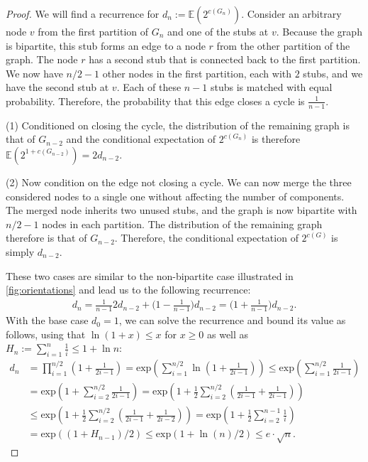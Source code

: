\documentclass[a4paper,USenglish,cleveref]{lipics-v2021}
\begin{document}
\begin{proof}
  We will find a recurrence for $d_n := \mathds{E}(2^{c(G_n)})$.
  Consider an arbitrary node $v$ from the first partition of $G_n$ and one of the stubs at $v$.
  Because the graph is bipartite, this stub forms an edge to a node $r$ from the other partition of the graph.
  The node $r$ has a second stub that is connected back to the first partition.
  We now have $n/2-1$ other nodes in the first partition, each with $2$ stubs, and we have the second stub at $v$.
  Each of these $n-1$ stubs is matched with equal probability.
  Therefore, the probability that this edge closes a cycle is $\frac{1}{n-1}$.

  (1) Conditioned on closing the cycle, the distribution of the remaining graph is that of $G_{n-2}$ and the conditional expectation of $2^{c(G_n)}$ is therefore $\mathds{E}(2^{1+c(G_{n-2})}) = 2d_{n-2}$.

  (2) Now condition on the edge not closing a cycle.
  We can now merge the three considered nodes to a single one without affecting the number of components.
  The merged node inherits two unused stubs, and the graph is now bipartite with $n/2-1$ nodes in each partition.
  The distribution of the remaining graph therefore is that of $G_{n-2}$.
  Therefore, the conditional expectation of $2^{c(G)}$ is simply $d_{n-2}$.

  These two cases are similar to the non-bipartite case illustrated in \cref{fig:orientations} and lead us to the following recurrence:
  \begin{align*}
    d_{n}=\tfrac{1}{n-1}2d_{n-2}+\big(1-\tfrac{1}{n-1}\big)d_{n-2}=\big(1+\tfrac{1}{n-1}\big)d_{n-2}.
  \end{align*}
  With the base case $d_0=1$, we can solve the recurrence and bound its value as follows, using that $\ln(1+x) \leq x$ for $x \geq 0$ as well as $H_n := \sum_{i = 1}^n \frac 1i \leq 1 + \ln n$:
  \begin{align*}
    d_{n}
    &= \prod_{i=1}^{n/2} \left( 1 + \frac{1}{2i-1} \right)
    = \textrm{exp}\left(\sum_{i=1}^{n/2} \ln\left(1 + \frac{1}{2i-1}\right)\right)
    \leq \textrm{exp}\left(\sum_{i=1}^{n/2} \frac{1}{2i-1}\right)\\
    &= \textrm{exp}\left(1 + \sum_{i=2}^{n/2} \frac{1}{2i-1}\right)
    = \textrm{exp}\left(1 + \frac{1}{2}\sum_{i=2}^{n/2} \left(\frac{1}{2i-1} + \frac{1}{2i-1}\right)\right)\\
    &\leq \textrm{exp}\left(1 + \frac{1}{2}\sum_{i=2}^{n/2} \left(\frac{1}{2i-1} + \frac{1}{2i-2}\right)\right)
    = \textrm{exp}\left(1 + \frac{1}{2}\sum_{i=2}^{n-1} \frac{1}{i}\right)\\
    &= \textrm{exp}\left((1+H_{n-1})/2\right)
    \leq \textrm{exp}\left(1 + \ln(n)/2\right)
    \leq e\cdot\sqrt{n}.
    \tag*{\qedhere}
  \end{align*}
\end{proof}
\end{document}
